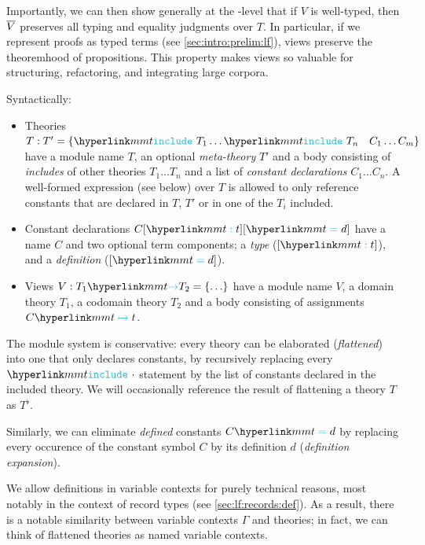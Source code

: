 Importantly, we can then show generally at the \mmt-level that if $V$ is well-typed, then $\overline{V}$ preserves all typing and equality judgments over $T$.
In particular, if we represent proofs as typed terms (see \autoref{sec:intro:prelim:lf}), views preserve the theoremhood of propositions.
This property makes views so valuable for structuring, refactoring, and integrating large corpora.\medskip

Syntactically:
\begin{itemize}
	\item Theories $T: T' = \{ \incl{T_1}\ldots\incl{T_n}\quad C_1\ldots C_m \}$ have a module name $T$, an optional \emph{meta-theory} $T'$ and a body consisting of \emph{includes} of other theories $T_1\ldots T_n$
		 and a list of \emph{constant declarations} $C_1\ldots C_n$. A well-formed expression (see below) over $T$ is allowed to only reference constants that are declared in $T$, $T'$ or in one of the $T_i$ included.
	\item Constant declarations $C[\mmttp t][\mmtdf d]$ have a name $C$ and two optional term components; a \emph{type} ($[\mmttp t]$), and a \emph{definition} ($[\mmtdf d]$).
	\item Views $V : \viewto{T_1}{T_2} = \{ \ldots \}$ have a module name $V$, a domain theory $T_1$, a codomain theory $T_2$ and a body consisting of assignments $C \mmtass t$.
\end{itemize}

\begin{remark}\label{remark:prelim:mmt:syntax}
The module system is conservative: every theory can be elaborated (\emph{flattened}) into one that only declares constants, by recursively replacing every $\incl\cdot$ statement by the list of constants declared in the included theory. We will occasionally reference the result of flattening a theory $T$ as $T^\flat$.

Similarly, we can eliminate \emph{defined} constants $C\mmtdf d$ by replacing every occurence of the constant symbol $C$ by its definition $d$ (\emph{definition expansion}).

We allow definitions in variable contexts for purely technical reasons, most notably in the context of record types (see \autoref{sec:lf:records:def}). As a result, there is a notable similarity between variable contexts $\Gamma$ and theories; in fact, we can think of flattened theories as named variable contexts.
\end{remark}

